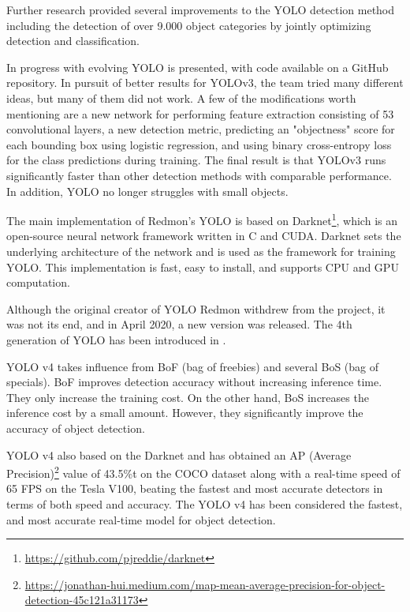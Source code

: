 Further research \citep{yolo2} provided several improvements to the YOLO detection method including the detection of over 9.000 object categories by jointly optimizing detection and classification.

In \citep{yolo3} progress with evolving YOLO is presented, with code available on a GitHub repository. In pursuit of better results for YOLOv3, the team tried many different ideas, but many of them did not work. A few of the modifications worth mentioning are a new network for performing feature extraction consisting of 53 convolutional layers, a new detection metric, predicting an "objectness" score for each bounding box using logistic regression, and using binary cross-entropy loss for the class predictions during training. The final result is that YOLOv3 runs significantly faster than other detection methods with comparable performance. In addition, YOLO no longer struggles with small objects.

The main implementation of Redmon's YOLO is based on Darknet\footnote{\href{https://github.com/pjreddie/darknet}{https://github.com/pjreddie/darknet}}, which is an open-source neural network framework written in C and CUDA. Darknet sets the underlying architecture of the network and is used as the framework for training YOLO. This implementation is fast, easy to install, and supports CPU and GPU computation.

Although the original creator of YOLO Redmon withdrew from the project, it was not its end, and in April 2020, a new version was released. The 4th generation of YOLO has been introduced in \citep{yolo4}.

YOLO v4 takes influence from BoF (bag of freebies) and several BoS (bag of specials). BoF improves detection accuracy without increasing inference time. They only increase the training cost. On the other hand, BoS increases the inference cost by a small amount. However, they significantly improve the accuracy of object detection.

YOLO v4 also based on the Darknet and has obtained an AP (Average Precision)\footnote{\href{https://jonathan-hui.medium.com/map-mean-average-precision-for-object-detection-45c121a31173}{https://jonathan-hui.medium.com/map-mean-average-precision-for-object-detection-45c121a31173}\label{map-mean-average-precision-for-object-detection}} value of 43.5\%t on the COCO dataset along with a real-time speed of 65 FPS on the Tesla V100, beating the fastest and most accurate detectors in terms of both speed and accuracy. The YOLO v4 has been considered the fastest, and most accurate real-time model for object detection.

